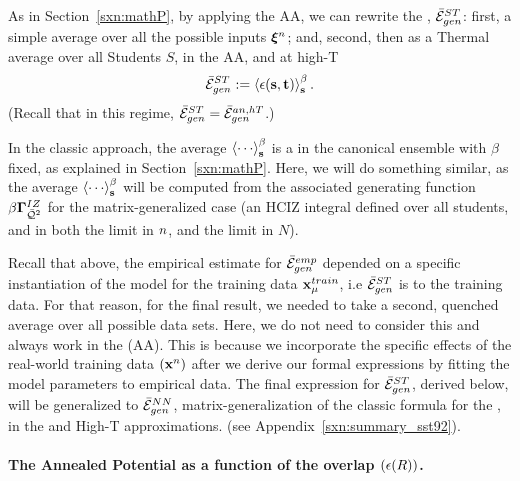 As in Section~\ref{sxn:mathP}, by applying the AA, we can rewrite the \AverageSTGeneralizationError, $\bar{\mathcal{E}}^{ST}_{gen}$:
first, a simple average over all the possible inputs $\boldsymbol{\xi}^{n}$; and, 
second, then as a Thermal average over all Students $S$, in the AA, and at high-T 
\begin{align}
\label{eqn:MGE}
\bar{\mathcal{E}}^{ST}_{gen}:=\left\langle \epsilon({\mathbf{s}}, {\mathbf{t}} ) \right\rangle_{\mathbf s}^{\beta} .
\end{align}
(Recall that in this regime, $\bar{\mathcal{E}}^{ST}_{gen}=\bar{\mathcal{E}}_{gen}^{an,hT}$.)

In the classic \STATMECH approach, the average $\THRMAVG{\cdots}$ is
a \ThermalAverage in the canonical ensemble with $\beta$ fixed,
as explained in Section~\ref{sxn:mathP}.  Here, we will do something similar, as the \Student
average $\THRMAVG{\cdots}$ will be computed from the associated
generating function $\beta\mathbf{\Gamma}^{IZ}_{\bar{\mathcal{Q}}^{2}}$ for the matrix-generalized case  (an HCIZ integral defined over all students,
and in both the \LargeN \Thermodynamic limit in $n$, and the \WideLayer \LargeN  limit in $N$).

Recall that above, the empirical estimate for $\bar{\mathcal{E}}^{emp}_{gen}$ depended on a
specific instantiation of the model for the training data $\mathbf{x}_{\mu}^{train}$,
i.e  $\bar{\mathcal{E}}^{ST}_{gen}$ is \Quenched to the training data.
For that reason, for the final result, we needed to take a second,
quenched average over all possible data sets.
Here, we do not need to consider this and always work in the \AnnealedApproximation(AA).
This is because we incorporate
the specific effects of the real-world training data $(\mathbf{x}^{n})$ after we derive our formal expressions
by fitting the model parameters to empirical data.
The final expression for $\bar{\mathcal{E}}^{ST}_{gen}$, derived below,
will be generalized to $\bar{\mathcal{E}}^{NN}_{gen}$, matrix-generalization of  the classic \STATMECH formula
for the \LinearPerceptron, in the \Annealed and High-T approximations.
(see Appendix~\ref{sxn:summary_sst92}). 

\paragraph{The Annealed Potential as a function of the overlap $(\epsilon(R))$.}

